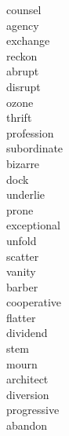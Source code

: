 \documentclass[a4paper, 11pt]{ctexart}
\begin{document}
\begin{multicols*}{3}
\begin{description}
\item[counsel]

\item[agency]

\item[exchange]

\item[reckon]

\item[abrupt]

\item[disrupt]

\item[ozone]

\item[thrift]

\item[profession]

\item[subordinate]

\item[bizarre]

\item[dock]

\item[underlie]

\item[prone]

\item[exceptional]

\item[unfold]

\item[scatter]

\item[vanity]

\item[barber]

\item[cooperative]

\item[flatter]

\item[dividend]

\item[stem]

\item[mourn]

\item[architect]

\item[diversion]

\item[progressive]

\item[abandon]


\end{description}
\end{multicols*}
\end{document}
